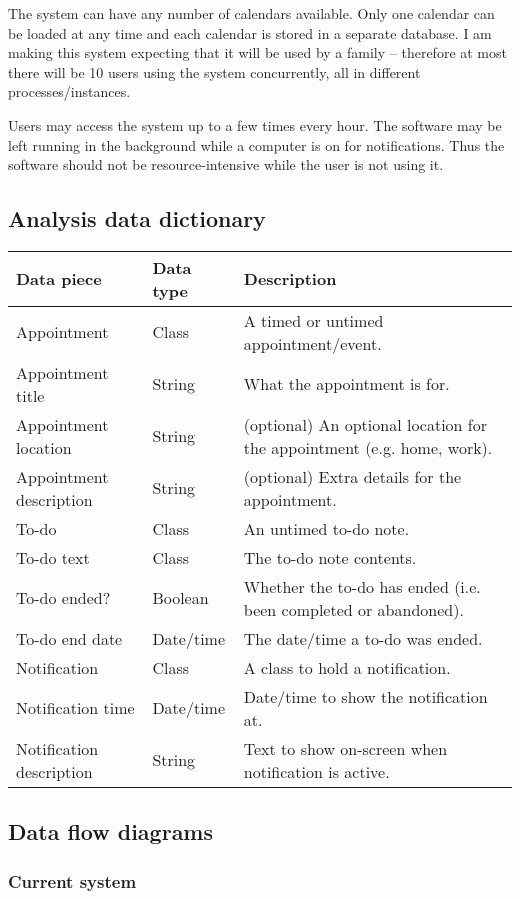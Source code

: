 The system can have any number of calendars available. Only one calendar can be
loaded at any time and each calendar is stored in a separate database. I am
making this system expecting that it will be used by a family -- therefore at
most there will be 10 users using the system concurrently, all in different
processes/instances.

Users may access the system up to a few times every hour. The software may be
left running in the background while a computer is on for notifications. Thus
the software should not be resource-intensive while the user is not using it.


\subsection{Analysis data dictionary}

\newcommand{\dictline}[1]{#1 \\ \hline}

\begin{tabulary}{\linewidth}{|L|L|L|} \hline
  \textbf{Data piece} & \textbf{Data type} & \textbf{Description} \\ \hline
  \dictline{Appointment & Class & A timed or untimed appointment/event.}
  \dictline{Appointment title & String & What the appointment is for.}
  \dictline{Appointment location & String & (optional) An optional location for the appointment (e.g. home, work).}
  \dictline{Appointment description & String & (optional) Extra details for the appointment.}
  \dictline{To-do & Class & An untimed to-do note.}
  \dictline{To-do text & Class & The to-do note contents.}
  \dictline{To-do ended? & Boolean & Whether the to-do has ended (i.e. been completed or abandoned).}
  \dictline{To-do end date & Date/time & The date/time a to-do was ended.}
  \dictline{Notification & Class & A class to hold a notification.}
  \dictline{Notification time & Date/time & Date/time to show the notification at.}
  \dictline{Notification description & String & Text to show on-screen when notification is active.}
\end{tabulary}


\subsection{Data flow diagrams}
\subsubsection{Current system}

